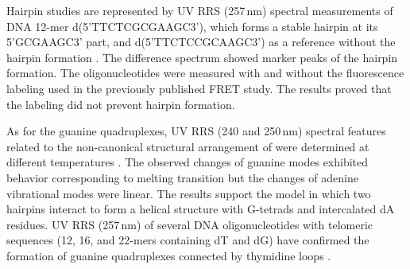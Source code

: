 Hairpin studies are represented by UV RRS (257\,nm) spectral measurements of
DNA 12-mer d(5'TTCTCGCGAAGC3'), which forms a stable hairpin at its
5'GCGAAGC3' part, and d(5'TTCTCCGCAAGC3') as a reference without the hairpin
formation
\parencite{Refregiers1997}.
The difference spectrum showed marker peaks of the hairpin formation.
The oligonucleotides were measured with and without the fluorescence labeling
used in the previously published FRET study.
The results proved that the labeling did not prevent hairpin formation.

As for the guanine quadruplexes, UV RRS (240 and 250\,nm) spectral features
related to the non-canonical structural arrangement of  were
determined at different temperatures
\parencite{%
	Mukerji1995,%
	Mukerji1996%
}.
The observed changes of guanine modes exhibited behavior corresponding to
melting transition but the changes of adenine vibrational modes were linear.
The results support the model in which two hairpins interact to form a helical
structure with G-tetrads and intercalated dA residues.
UV RRS (257\,nm) of several DNA oligonucleotides with telomeric sequences (12,
16, and 22-mers containing dT and dG) have confirmed the formation of guanine
quadruplexes connected by thymidine loops
\parencite{Krafft2002}.
